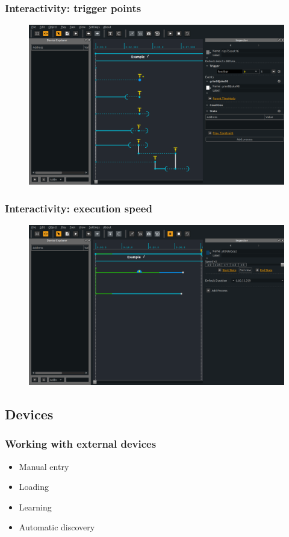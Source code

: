 \documentclass[handout]{beamer}
\begin{document}
\begin{frame}
\frametitle{Interactivity: trigger points}
\Large
\begin{figure}
    \includegraphics[width=\textwidth]{images/triggers.png}
\end{figure}
\end{frame}

\begin{frame}
\frametitle{Interactivity: execution speed}
\Large
\begin{figure}
    \includegraphics[width=\textwidth]{images/speed.png}
\end{figure}
\end{frame}

\subsection{Devices}
\begin{frame}
\frametitle{Working with external devices}
\Large
\begin{itemize}
    \item<1> Manual entry
    \item<2> Loading
    \item<3> Learning
    \item<4> Automatic discovery
\end{itemize}
\end{frame}
\end{document}

